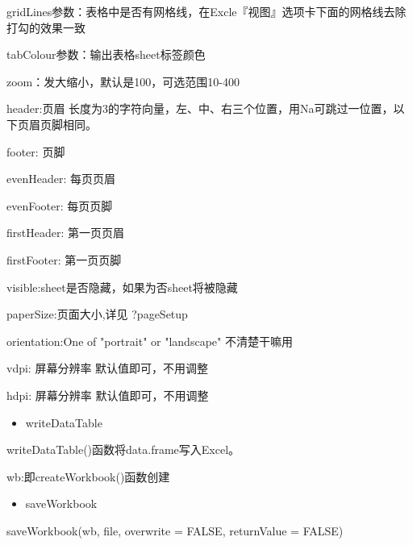 \documentclass[
]{book}
\newenvironment{Shaded}{\begin{snugshade}}{\end{snugshade}}
\newcommand{\AttributeTok}[1]{\textcolor[rgb]{0.77,0.63,0.00}{#1}}
\newcommand{\ConstantTok}[1]{\textcolor[rgb]{0.00,0.00,0.00}{#1}}
\newcommand{\DecValTok}[1]{\textcolor[rgb]{0.00,0.00,0.81}{#1}}
\newcommand{\FunctionTok}[1]{\textcolor[rgb]{0.00,0.00,0.00}{#1}}
\newcommand{\NormalTok}[1]{#1}
\newcommand{\SpecialCharTok}[1]{\textcolor[rgb]{0.00,0.00,0.00}{#1}}
\newcommand{\StringTok}[1]{\textcolor[rgb]{0.31,0.60,0.02}{#1}}
\providecommand{\tightlist}{%
  \setlength{\itemsep}{0pt}\setlength{\parskip}{0pt}}
\begin{document}
\begin{Shaded}
\begin{Highlighting}[]
\NormalTok{gridLines参数：表格中是否有网格线，在Excle『视图』选项卡下面的网格线去除打勾的效果一致}

\NormalTok{tabColour参数：输出表格sheet标签颜色}

\NormalTok{zoom：发大缩小，默认是100，可选范围10}\DecValTok{{-}400}

\NormalTok{header}\SpecialCharTok{:}\NormalTok{页眉 长度为3的字符向量，左、中、右三个位置，用Na可跳过一位置，以下页眉页脚相同。}

\NormalTok{footer}\SpecialCharTok{:}\NormalTok{ 页脚}

\NormalTok{evenHeader}\SpecialCharTok{:}\NormalTok{ 每页页眉}

\NormalTok{evenFooter}\SpecialCharTok{:}\NormalTok{ 每页页脚}

\NormalTok{firstHeader}\SpecialCharTok{:}\NormalTok{ 第一页页眉}

\NormalTok{firstFooter}\SpecialCharTok{:}\NormalTok{ 第一页页脚}

\NormalTok{visible}\SpecialCharTok{:}\NormalTok{sheet是否隐藏，如果为否sheet将被隐藏}

\NormalTok{paperSize}\SpecialCharTok{:}\NormalTok{页面大小,详见 ?pageSetup }

\NormalTok{orientation}\SpecialCharTok{:}\NormalTok{One of }\StringTok{"portrait"}\NormalTok{ or }\StringTok{"landscape"}\NormalTok{ 不清楚干嘛用}

\NormalTok{vdpi}\SpecialCharTok{:}\NormalTok{ 屏幕分辨率 默认值即可，不用调整}

\NormalTok{hdpi}\SpecialCharTok{:}\NormalTok{ 屏幕分辨率 默认值即可，不用调整}
\end{Highlighting}
\end{Shaded}

\begin{itemize}
\tightlist
\item
  writeDataTable
\end{itemize}

writeDataTable()函数将data.frame写入Excel。

wb:即createWorkbook()函数创建

\begin{itemize}
\tightlist
\item
  saveWorkbook
\end{itemize}

\begin{Shaded}
\begin{Highlighting}[]
\FunctionTok{saveWorkbook}\NormalTok{(wb, file, }\AttributeTok{overwrite =} \ConstantTok{FALSE}\NormalTok{, }\AttributeTok{returnValue =} \ConstantTok{FALSE}\NormalTok{)}
\end{Highlighting}
\end{Shaded}
\end{document}
